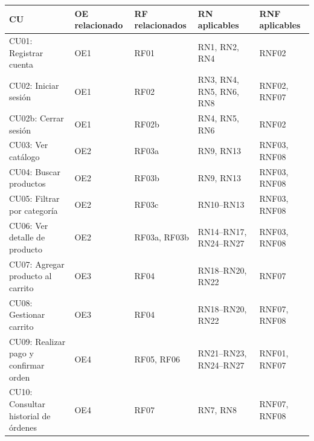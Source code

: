 \documentclass[12pt,a4paper]{article}
\begin{document}
\renewcommand{\arraystretch}{1.0}
\begin{tabularx}{\linewidth}{|p{2.5cm}|X|X|X|X|}
    \hline
    \textbf{CU}                              & \textbf{OE relacionado} & \textbf{RF relacionados} & \textbf{RN aplicables}         & \textbf{RNF aplicables} \\ \hline
    CU01: Registrar cuenta                   & OE1                     & RF01                     & RN1, RN2, RN4                  & RNF02                   \\ \hline
    CU02: Iniciar sesión                     & OE1                     & RF02                     & RN3, RN4, RN5, RN6, RN8        & RNF02, RNF07            \\ \hline
    CU02b: Cerrar sesión                     & OE1                     & RF02b                    & RN4, RN5, RN6                  & RNF02
    \\ \hline
    CU03: Ver catálogo                       & OE2                     & RF03a                    & RN9, RN13                      & RNF03, RNF08            \\ \hline
    CU04: Buscar productos                   & OE2                     & RF03b                    & RN9, RN13                      & RNF03, RNF08            \\ \hline
    CU05: Filtrar por categoría              & OE2                     & RF03c                    & RN10--RN13                     & RNF03, RNF08            \\ \hline
    CU06: Ver detalle de producto            & OE2                     & RF03a, RF03b             & RN14--RN17, RN24--RN27         & RNF03, RNF08            \\ \hline
    CU07: Agregar producto al carrito        & OE3                     & RF04                     & RN18--RN20, RN22               & RNF07                   \\ \hline
    CU08: Gestionar carrito                  & OE3                     & RF04                     & RN18--RN20, RN22               & RNF07, RNF08            \\ \hline
    CU09: Realizar pago y confirmar orden    & OE4                     & RF05, RF06               & RN21--RN23, RN24--RN27         & RNF01, RNF07            \\ \hline
    CU10: Consultar historial de órdenes     & OE4                     & RF07                     & RN7, RN8                       & RNF07, RNF08            \\ \hline

\end{tabularx}
\end{document}
